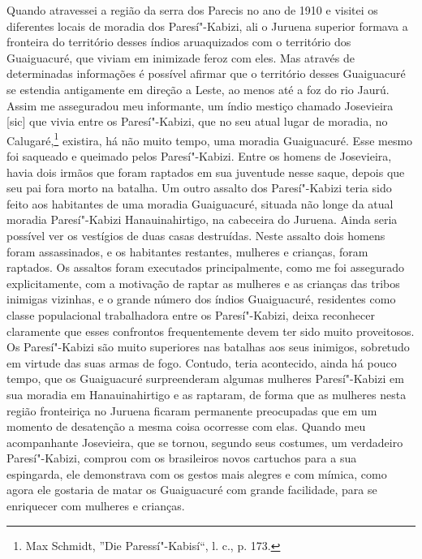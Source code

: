 Quando atravessei a região da serra dos Parecis no ano de 1910 e visitei
os diferentes locais de moradia dos Paresí"-Kabizi, ali o Juruena
superior formava a fronteira do território desses índios aruaquizados
com o território dos Guaiguacuré, que viviam em inimizade feroz com
eles. Mas através de determinadas informações é possível afirmar que o
território desses Guaiguacuré se estendia antigamente em direção a
Leste, ao menos até a foz do rio Jaurú. Assim me asseguradou meu
informante, um índio mestiço chamado Josevieira {[}sic{]} que vivia
entre os Paresí"-Kabizi, que no seu atual lugar de moradia, no
Calugaré,\footnote{Max Schmidt, ''Die Paressí"-Kabisí``, l. c., p. 173.}
existira, há não muito tempo, uma moradia Guaiguacuré. Esse mesmo foi
saqueado e queimado pelos Paresí"-Kabizi. Entre os homens de Josevieira,
havia dois irmãos que foram raptados em sua juventude nesse saque,
depois que seu pai fora morto na batalha. Um outro assalto dos
Paresí"-Kabizi teria sido feito aos habitantes de uma moradia
Guaiguacuré, situada não longe da atual moradia Paresí"-Kabizi
Hanauinahirtigo, na cabeceira do Juruena. Ainda seria possível ver os
vestígios de duas casas destruídas. Neste assalto dois homens foram
assassinados, e os habitantes restantes, mulheres e crianças, foram
raptados. Os assaltos foram executados principalmente, como me foi
assegurado explicitamente, com a motivação de raptar as mulheres e as
crianças das tribos inimigas vizinhas, e o grande número dos índios
Guaiguacuré, residentes como classe populacional trabalhadora entre os
Paresí"-Kabizi, deixa reconhecer claramente que esses confrontos
frequentemente devem ter sido muito proveitosos. Os Paresí"-Kabizi são
muito superiores nas batalhas aos seus inimigos, sobretudo em virtude
das suas armas de fogo. Contudo, teria acontecido, ainda há pouco
tempo, que os Guaiguacuré surpreenderam algumas mulheres Paresí"-Kabizi
em sua moradia em Hanauinahirtigo e as raptaram, de forma que as
mulheres nesta região fronteiriça no Juruena ficaram permanente
preocupadas que em um momento de desatenção a mesma coisa ocorresse com
elas. Quando meu acompanhante Josevieira, que se tornou, segundo seus
costumes, um verdadeiro Paresí"-Kabizi, comprou com os brasileiros novos
cartuchos para a sua espingarda, ele demonstrava com os gestos mais
alegres e com mímica, como agora ele gostaria de matar os Guaiguacuré
com grande facilidade, para se enriquecer com mulheres e crianças.

